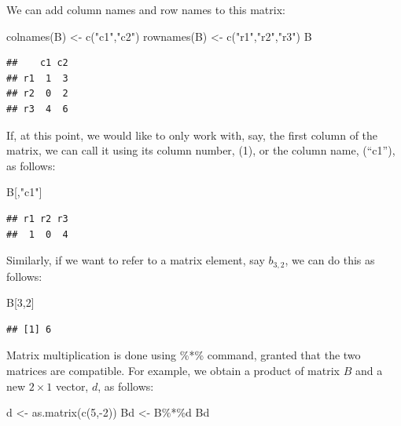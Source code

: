 \documentclass[
  12pt,
  oneside]{book}
\newenvironment{Shaded}{\begin{snugshade}}{\end{snugshade}}
\newcommand{\DecValTok}[1]{\textcolor[rgb]{0.00,0.00,0.81}{#1}}
\newcommand{\FunctionTok}[1]{\textcolor[rgb]{0.00,0.00,0.00}{#1}}
\newcommand{\NormalTok}[1]{#1}
\newcommand{\OtherTok}[1]{\textcolor[rgb]{0.56,0.35,0.01}{#1}}
\newcommand{\SpecialCharTok}[1]{\textcolor[rgb]{0.00,0.00,0.00}{#1}}
\newcommand{\StringTok}[1]{\textcolor[rgb]{0.31,0.60,0.02}{#1}}
\begin{document}
We can add column names and row names to this matrix:

\begin{Shaded}
\begin{Highlighting}[]
\FunctionTok{colnames}\NormalTok{(B) }\OtherTok{\textless{}{-}} \FunctionTok{c}\NormalTok{(}\StringTok{"c1"}\NormalTok{,}\StringTok{"c2"}\NormalTok{)}
\FunctionTok{rownames}\NormalTok{(B) }\OtherTok{\textless{}{-}} \FunctionTok{c}\NormalTok{(}\StringTok{"r1"}\NormalTok{,}\StringTok{"r2"}\NormalTok{,}\StringTok{"r3"}\NormalTok{)}
\NormalTok{B}
\end{Highlighting}
\end{Shaded}

\begin{verbatim}
##    c1 c2
## r1  1  3
## r2  0  2
## r3  4  6
\end{verbatim}

If, at this point, we would like to only work with, say, the first column of the matrix, we can call it using its column number, (1), or the column name, (``c1''), as follows:

\begin{Shaded}
\begin{Highlighting}[]
\NormalTok{B[,}\StringTok{"c1"}\NormalTok{]}
\end{Highlighting}
\end{Shaded}

\begin{verbatim}
## r1 r2 r3 
##  1  0  4
\end{verbatim}

Similarly, if we want to refer to a matrix element, say \(b_{3,2}\), we can do this as follows:

\begin{Shaded}
\begin{Highlighting}[]
\NormalTok{B[}\DecValTok{3}\NormalTok{,}\DecValTok{2}\NormalTok{]}
\end{Highlighting}
\end{Shaded}

\begin{verbatim}
## [1] 6
\end{verbatim}

Matrix multiplication is done using \%*\% command, granted that the two matrices are compatible. For example, we obtain a product of matrix \(B\) and a new \(2 \times 1\) vector, \(d\), as follows:

\begin{Shaded}
\begin{Highlighting}[]
\NormalTok{d }\OtherTok{\textless{}{-}} \FunctionTok{as.matrix}\NormalTok{(}\FunctionTok{c}\NormalTok{(}\DecValTok{5}\NormalTok{,}\SpecialCharTok{{-}}\DecValTok{2}\NormalTok{))}
\NormalTok{Bd }\OtherTok{\textless{}{-}}\NormalTok{ B}\SpecialCharTok{\%*\%}\NormalTok{d}
\NormalTok{Bd}
\end{Highlighting}
\end{Shaded}
\end{document}
